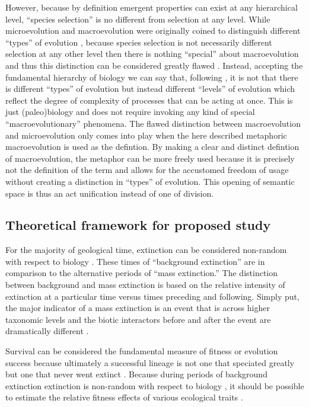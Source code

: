 \documentclass[12pt,letterpaper]{article}
\begin{document}

However, because by definition emergent properties can exist at any hierarchical level, ``species selection'' is no different from selection at any level. While microevolution and macroevolution were originally coined to distinguish different ``types'' of evolution \citep{Goldschmidt1940}, because species selection is not necessarily different selection at any other level then there is nothing ``special'' about macroevolution and thus this distinction can be considered greatly flawed \citep{Simpson1953}. Instead, accepting the fundamental hierarchy of biology \citep{Vrba1984} we can say that, following \citet{Simpson1953}, it is not that there is different ``types'' of evolution but instead different ``levels'' of evolution which reflect the degree of complexity of processes that can be acting at once. This is just (paleo)biology and does not require invoking any kind of special ``macroevolutionary'' phenomena. The flawed distinction between macroevolution and microevolution only comes into play when the here described metaphoric macroevolution is used as the defintion. By making a clear and distinct defintion of macroevolution, the metaphor can be more freely used because it is precisely not the definition of the term and allows for the accustomed freedom of usage without creating a distinction in ``types'' of evolution. This opening of semantic space is thus an act unification instead of one of division. 


\subsection{Theoretical framework for proposed study}
For the majority of geological time, extinction can be considered non-random with respect to biology \citep{Jablonski1986}. These times of ``background extinction'' are in comparison to the alternative periods of ``mass extinction.'' The distinction between background and mass extinction is based on the relative intensity of extinction at a particular time versus times preceding and following. Simply put, the major indicator of a mass extinction is an event that is across higher taxonomic levels and the biotic interactors before and after the event are dramatically different \citep{Jablonski1986,Jablonski2005,Kitchell1986,Kitchell1991}.

Survival can be considered the fundamental measure of fitness or evolution success because ultimately a successful lineage is not one that speciated greatly but one that never went extinct \citep{Cooper1984,Palmer2012}. Because during periods of background extinction extinction is non-random with respect to biology \citep{Jablonski1986}, it should be possible to estimate the relative fitness effects of various ecological traits \citep{Kitchell1990,Kitchell1985a}. 
\end{document}
